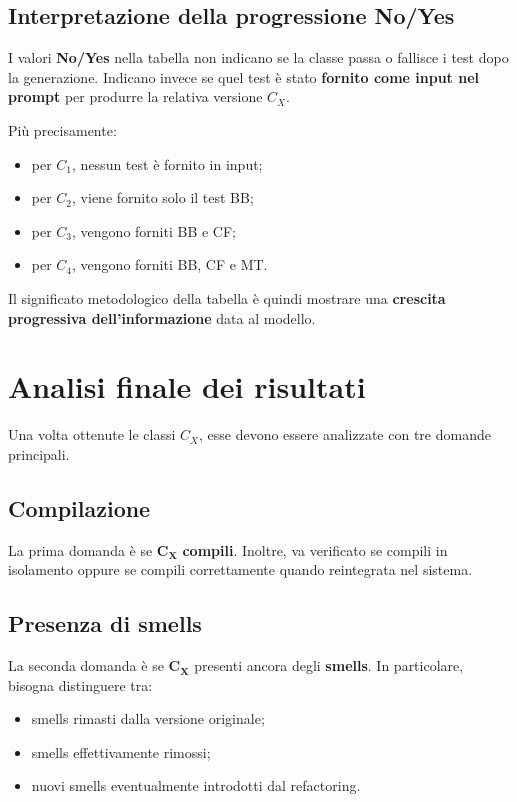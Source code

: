 \subsection{Interpretazione della progressione No/Yes}

I valori \textbf{No/Yes} nella tabella non indicano se la classe passa o fallisce i test dopo la generazione. Indicano invece se quel test è stato \textbf{fornito come input nel prompt} per produrre la relativa versione \(C_X\).

Più precisamente:

\begin{itemize}
    \item per \(C_1\), nessun test è fornito in input;
    \item per \(C_2\), viene fornito solo il test BB;
    \item per \(C_3\), vengono forniti BB e CF;
    \item per \(C_4\), vengono forniti BB, CF e MT.
\end{itemize}

Il significato metodologico della tabella è quindi mostrare una \textbf{crescita progressiva dell'informazione} data al modello.

\section{Analisi finale dei risultati}

Una volta ottenute le classi \(C_X\), esse devono essere analizzate con tre domande principali.

\subsection{Compilazione}

La prima domanda è se \(\mathbf{C_X}\) \textbf{compili}. Inoltre, va verificato se compili in isolamento oppure se compili correttamente quando reintegrata nel sistema.

\subsection{Presenza di smells}

La seconda domanda è se \(\mathbf{C_X}\) presenti ancora degli \textbf{smells}. In particolare, bisogna distinguere tra:

\begin{itemize}
    \item smells rimasti dalla versione originale;
    \item smells effettivamente rimossi;
    \item nuovi smells eventualmente introdotti dal refactoring.
\end{itemize}

